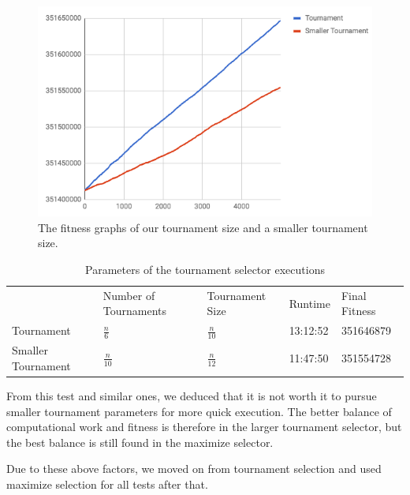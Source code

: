 \begin{figure}
    \centering
    \includegraphics[width=0.6\linewidth]{SmallTournament.png}
    \caption[Tournament selector comparison]{The fitness graphs of our tournament size and a smaller tournament size.}
    \label{fig:smallTourn}
\end{figure}

\begin{table}[]
\centering
\caption{Parameters of the tournament selector executions}
\label{table:tournTable}
\begin{tabular}{lllll}
                   & Number of Tournaments & Tournament Size & Runtime  & Final Fitness \\
Tournament         & $\frac{n}{6}$         & $\frac{n}{10}$      & 13:12:52      & 351646879     \\
Smaller Tournament & $\frac{n}{10}$        & $\frac{n}{12}$      & 11:47:50      & 351554728    
\end{tabular}
\end{table}

From this test and similar ones, we deduced that it is not worth it to pursue smaller tournament parameters for more quick execution. The better balance of computational work and fitness is therefore in the larger tournament selector, but the best balance is still found in the maximize selector.

Due to these above factors, we moved on from tournament selection and used maximize selection for all tests after that.

